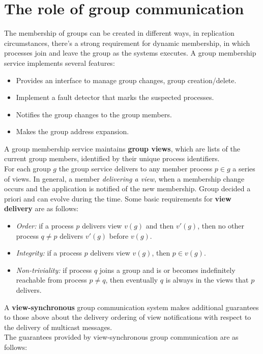 \section{The role of group communication}
The membership of groups can be created in different ways, in replication circumstances, there's a strong requirement for dynamic membership, in which processes join and leave the group as the systems executes. A group membership service implements several features:
\begin{itemize}
	\item Provides an interface to manage group changes, group creation/delete.
	\item Implement a fault detector that marks the suspected processes.
	\item Notifies the group changes to the group members.
	\item Makes the group address expansion.
\end{itemize}
A group membership service maintains \textbf{group views}, which are lists of the current group members, identified by their unique process identifiers.\\
For each group $g$ the group service delivers to any member process $p \in g$ a series of views. In general, a member \textit{delivering a view}, when a membership change occurs and the application is notified of the new membership. Group decided a priori and can evolve during the time.
Some basic requirements for \textbf{view delivery} are as follows:
\begin{itemize}
	\item \textit{Order:} if a process $p$ delivers view $v(g)$ and then $v'(g)$, then no other process $q \neq p$ delivers $v'(g)$ before $v(g)$.
	\item \textit{Integrity:} if a process $p$ delivers view $v(g)$, then $p \in v(g)$.
	\item \textit{Non-triviality:} if process $q$ joins a group and is or becomes indefinitely reachable from process $p \neq q$, then eventually $q$ is always in the views that $p$ delivers.
\end{itemize}
A \textbf{view-synchronous} group communication system makes additional guarantees to those above about the delivery ordering of view notifications with respect to the delivery of multicast messages.\\
The guarantees provided by view-synchronous group communication are as follows:
